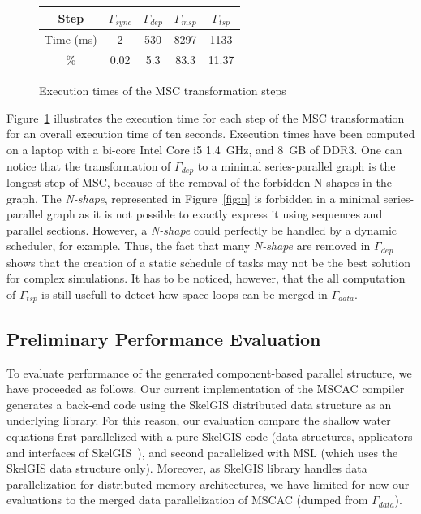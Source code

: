 \begin{figure}[!h]
 \begin{center}
 \begin{tabular}{|c|c|c|c|c|}
  \hline
   Step & $\Gamma_{sync}$ & $\Gamma_{dep}$ & $\Gamma_{msp}$ & $\Gamma_{tsp}$\\
   \hline
   Time (ms) & 2 & 530 & 8297 & 1133\\
   \hline
   \% & 0.02 & 5.3 & 83.3 & 11.37\\
   \hline
 \end{tabular}
\caption{Execution times of the MSC transformation steps}
\label{fig:exectime}
 \end{center}
\end{figure}

Figure~\ref{fig:exectime} illustrates the execution time for each step of the MSC transformation for an overall execution time of ten seconds. Execution times have been computed on a laptop with a bi-core Intel Core i5 1.4~GHz, and 8~GB of DDR3. 
One can notice that the transformation of $\Gamma_{dep}$ to a minimal series-parallel graph is the longest step of MSC, because of the removal of the forbidden N-shapes in the graph. %
The \emph{N-shape}, represented in Figure~\ref{fig:n} is forbidden in a minimal series-parallel graph as it is not possible to exactly express it using sequences and parallel sections. However, a \emph{N-shape} could perfectly be handled by a dynamic scheduler, for example.
Thus, the fact that many \emph{N-shape} are removed in $\Gamma_{dep}$ shows that the creation of a static schedule of tasks may not be the best solution for complex simulations. It has to be noticed, however, that the all computation of $\Gamma_{tsp}$ is still usefull to detect how space loops can be merged in $\Gamma_{data}$.

\subsection{Preliminary Performance Evaluation}
To evaluate performance of the generated component-based parallel structure, we have proceeded as follows. Our current implementation of the MSCAC compiler generates a back-end code using the SkelGIS distributed data structure as an underlying library. For this reason, our evaluation compare the shallow water equations first parallelized with a pure SkelGIS code (data structures, applicators and interfaces of SkelGIS~\cite{CPE:CPE3494}), and second parallelized with MSL (which uses the SkelGIS data structure only). Moreover, as SkelGIS library handles data parallelization for distributed memory architectures, we have limited for now our evaluations to the merged data parallelization of MSCAC (dumped from $\Gamma_{data}$). 

